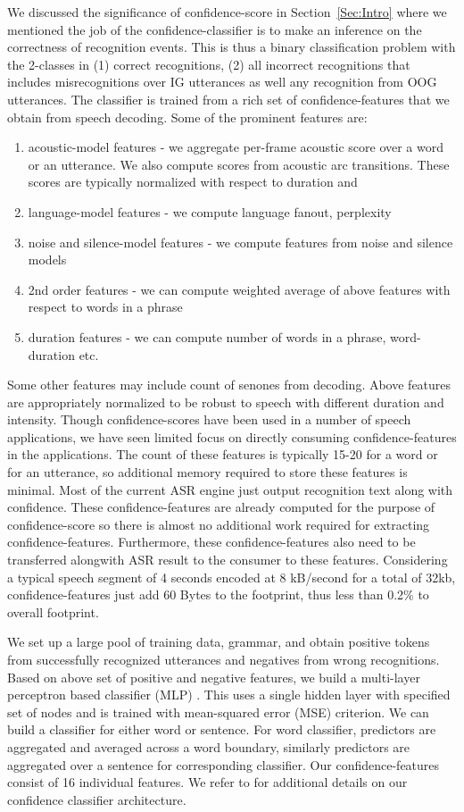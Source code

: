 We discussed the significance of confidence-score in Section~\ref{Sec:Intro} where we mentioned the job of the 
confidence-classifier is to make an inference on the correctness of recognition events. This is thus a binary
classification problem \cite{Bishop} with the 2-classes in (1) correct recognitions, (2) all incorrect
recognitions that includes misrecognitions over IG utterances as well any recognition
from OOG utterances. The classifier is trained from a rich set of confidence-features that we obtain from speech decoding.
Some of the prominent features are:
\begin{enumerate}
  \item acoustic-model features - we aggregate per-frame acoustic score over a word or an utterance. We also compute scores from acoustic arc transitions. These scores are typically normalized with respect to duration and 
  \item language-model features - we compute language fanout, perplexity
  \item noise and silence-model features - we compute features from noise and silence models
  \item 2nd order features - we can compute weighted average of above features with respect to words in a phrase
  \item duration features - we can compute number of words in a phrase, word-duration etc.
\end{enumerate}
Some other features may include count of senones from decoding. Above features are appropriately normalized to be robust to speech with different duration and intensity. Though confidence-scores have been used in a number of speech applications, we have seen limited focus on directly consuming confidence-features in the applications. The count of these features is typically 15-20 for a word or for an utterance, so additional memory required to store these features is minimal. Most of the current ASR engine just output recognition text along with confidence. These confidence-features are already computed for the purpose of confidence-score so there is almost no additional work required for extracting confidence-features. Furthermore, these confidence-features also need to be transferred alongwith ASR result to the consumer to these features. Considering a typical speech segment of 4 seconds encoded at 8 kB/second for a total of 32kb, confidence-features just add 60 Bytes to the footprint, thus less than 0.2\% to overall footprint.

We set up a large pool of training data, grammar, and obtain positive tokens from successfully recognized utterances and negatives from wrong recognitions. Based on above set of positive and negative features, we build a multi-layer perceptron based classifier (MLP) \cite{Mathan91, Bishop}. This uses a single hidden layer with specified set of nodes and is trained with mean-squared error (MSE) criterion. We can build a classifier for either word or sentence. For word classifier, predictors are aggregated and averaged across a word boundary, similarly predictors are aggregated over a sentence for corresponding classifier.
Our confidence-features consist of 16 individual features. We refer to \cite{Posen1} for additional details on our confidence classifier architecture.